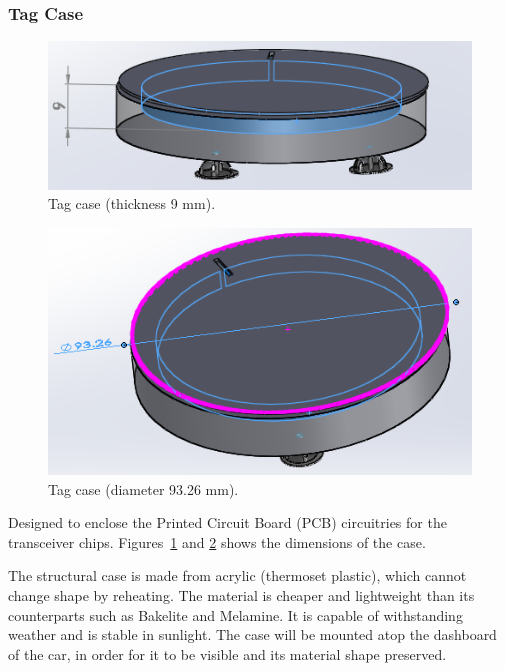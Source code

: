 \subsubsection{Tag Case}
\begin{figure}[H]
\begin{center}
\includegraphics[scale=0.6]{data/mechanical/1.png}
\caption{Tag case (thickness 9 mm).}
\label{fig:mech-1}
\end{center}
\end{figure}

\begin{figure}[H]
\begin{center}
\includegraphics[scale=0.6]{data/mechanical/2.png}
\caption{Tag case (diameter 93.26 mm).}
\label{fig:mech-2}
\end{center}
\end{figure}

Designed to enclose the Printed Circuit Board (PCB) circuitries for the transceiver chips. Figures~\ref{fig:mech-1} and \ref{fig:mech-2} shows the dimensions of the case.

The structural case is made from acrylic (thermoset plastic), which cannot change shape by reheating. The material is cheaper and lightweight than its counterparts such as Bakelite and Melamine.\cite{fig:mech-1} It is capable of withstanding weather and is stable in sunlight. The case will be mounted atop the dashboard of the car, in order for it to be visible and its material shape preserved.

